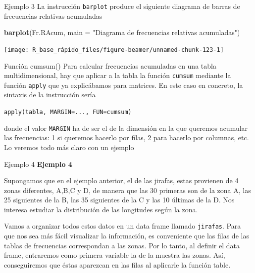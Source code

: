 \documentclass[
  ignorenonframetext,
  aspectratio=169]{beamer}
\newenvironment{Shaded}{\begin{snugshade}}{\end{snugshade}}
\newcommand{\AttributeTok}[1]{\textcolor[rgb]{0.13,0.29,0.53}{#1}}
\newcommand{\FunctionTok}[1]{\textcolor[rgb]{0.13,0.29,0.53}{\textbf{#1}}}
\newcommand{\NormalTok}[1]{#1}
\newcommand{\StringTok}[1]{\textcolor[rgb]{0.31,0.60,0.02}{#1}}
\begin{document}
\begin{frame}[fragile]{Ejemplo 3}
\label{ejemplo-3-4}
La instrucción \texttt{barplot} produce el siguiente diagrama de barras
de frecuencias relativas acumuladas

\begin{Shaded}
\begin{Highlighting}[]
\FunctionTok{barplot}\NormalTok{(Fr.RAcum, }\AttributeTok{main =} \StringTok{"Diagrama de frecuencias relativas acumuladas"}\NormalTok{)}
\end{Highlighting}
\end{Shaded}

\begin{center}\texttt{[image: R\_base\_rápido\_files/figure-beamer/unnamed-chunk-123-1]} \end{center}
\end{frame}

\begin{frame}[fragile]{Función cumsum()}
\label{funciuxf3n-cumsum-5}
Para calcular frecuencias acumuladas en una tabla multidimensional, hay
que aplicar a la tabla la función \texttt{cumsum} mediante la función
\texttt{apply} que ya explicábamos para matrices. En este caso en
concreto, la sintaxis de la instrucción sería

\texttt{apply(tabla,\ MARGIN=...,\ FUN=cumsum)}

donde el valor \texttt{MARGIN} ha de ser el de la dimensión en la que
queremos acumular las frecuencias: 1 si queremos hacerlo por filas, 2
para hacerlo por columnas, etc. Lo veremos todo más claro con un ejemplo
\end{frame}

\begin{frame}[fragile]{Ejemplo 4}
\label{ejemplo-4}
\textbf{Ejemplo 4}

Supongamos que en el ejemplo anterior, el de las jirafas, estas
provienen de 4 zonas diferentes, A,B,C y D, de manera que las 30
primeras son de la zona A, las 25 siguientes de la B, las 35 siguientes
de la C y las 10 últimas de la D. Nos interesa estudiar la distribución
de las longitudes según la zona.

Vamos a organizar todos estos datos en un data frame llamado
\texttt{jirafas}. Para que nos sea más fácil visualizar la información,
es conveniente que las filas de las tablas de frecuencias correspondan a
las zonas. Por lo tanto, al definir el data frame, entraremos como
primera variable la de la muestra las zonas. Así, conseguiremos que
éstas aparezcan en las filas al aplicarle la función table.
\end{frame}
\end{document}

